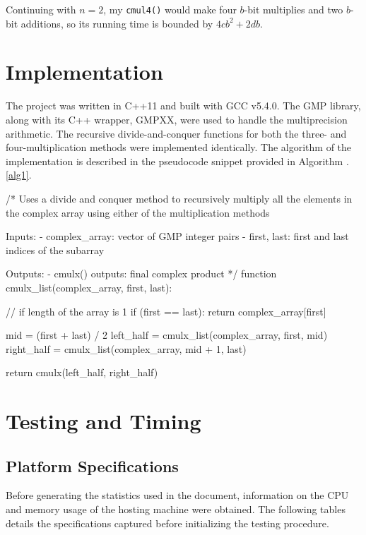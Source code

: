 \documentclass[usletter, 12pt]{article}
\begin{document}
        Continuing with $n=2$, my \texttt{cmul4()} would make four $b$-bit multiplies and two $b$-bit additions, so its running time is bounded by $4cb^2+2db$. 

    \section{Implementation}
    The project was written in C++11 and built with GCC v5.4.0. The GMP library, along with its C++ wrapper, GMPXX, were used to handle the multiprecision arithmetic. The recursive divide-and-conquer functions for both the three- and four-multiplication methods were implemented identically. The algorithm of the implementation is described in the pseudocode snippet provided in Algorithm \thesection.\ref{alg1}.

\begin{pseudocode}[caption={Divide and Conquer Multiplication}, label={alg1}]
/*
Uses a divide and conquer method to recursively multiply all the elements in
the complex array using either of the multiplication methods

Inputs:
    - complex_array: vector of GMP integer pairs
    - first, last: first and last indices of the subarray

Outputs:
    - cmulx() outputs: final complex product
*/
function cmulx_list(complex_array, first, last):

    // if length of the array is 1
    if (first == last):
        return complex_array[first]

    mid = (first + last) / 2
    left_half = cmulx_list(complex_array, first, mid)
    right_half = cmulx_list(complex_array, mid + 1, last)

    return cmulx(left_half, right_half)

\end{pseudocode}

    \section{Testing and Timing}

        \subsection{Platform Specifications}
        Before generating the statistics used in the document, information on the CPU and memory usage of the hosting machine were obtained. The following tables details the specifications captured before initializing the testing procedure.
\end{document}
